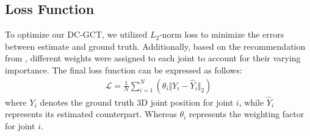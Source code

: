 \documentclass[journal]{IEEEtran}
\begin{document}
\subsection{Loss Function}

To optimize our DC-GCT, we utilized $L_2$-norm loss to minimize the errors between estimate and ground truth. Additionally, based on the recommendation from \cite{zhang2022mixste}, different weights were assigned to each joint to account for their varying importance. The final loss function can be expressed as follows:
\begin{gather}
\label{eq:lossg}
\mathcal{L} = \frac{1}{N} \sum_{i=1}^N(\theta_i \Vert Y_i - \widehat{Y}_i \Vert_2)
\end{gather}
where $Y_i$ denotes the ground truth 3D joint position for joint $i$, while $\widehat{Y}_i$ represents its estimated counterpart. Whereas $\theta_i$ represents the weighting factor for joint $i$.
\end{document}
